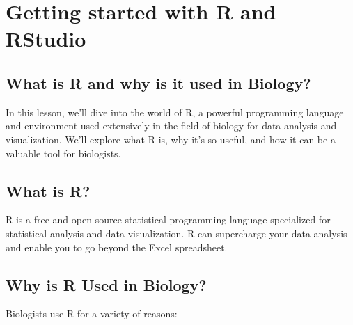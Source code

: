 \documentclass[
]{book}
\begin{document}
\hypertarget{getting-started-with-r-and-rstudio}{%
\chapter{Getting started with R and RStudio}\label{getting-started-with-r-and-rstudio}}

\hypertarget{what-is-r-and-why-is-it-used-in-biology}{%
\section{What is R and why is it used in Biology?}\label{what-is-r-and-why-is-it-used-in-biology}}

In this lesson, we'll dive into the world of R, a powerful programming language and environment used extensively in the field of biology for data analysis and visualization. We'll explore what R is, why it's so useful, and how it can be a valuable tool for biologists.

\hypertarget{what-is-r}{%
\section{What is R?}\label{what-is-r}}

R is a free and open-source statistical programming language specialized for statistical analysis and data visualization. R can supercharge your data analysis and enable you to go beyond the Excel spreadsheet.

\hypertarget{why-is-r-used-in-biology}{%
\section{Why is R Used in Biology?}\label{why-is-r-used-in-biology}}

Biologists use R for a variety of reasons:
\end{document}
